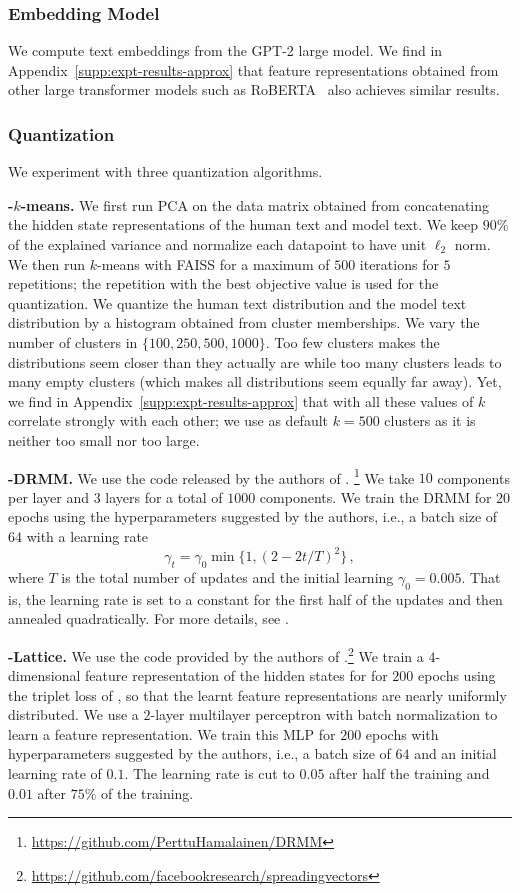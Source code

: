 \documentclass{article}
\newcommand{\myparagraph}[1]{\par\noindent\textbf{{#1}.}} %
\theoremstyle{definition}
\newcommand{\name}{{\fontfamily{bch}\selectfont{\textsc{Mauve}}}\xspace}
\begin{document}
\subsubsection{Embedding Model}
We compute text embeddings from 
the GPT-2 large model. 
We find in Appendix~\ref{supp:expt-results-approx} that feature representations obtained from other large transformer models such as RoBERTA~\cite{liu2019roberta}
also achieves similar results. 

\subsubsection{Quantization}
We experiment with three quantization algorithms. 

\myparagraph{\name-$k$-means}
We first run PCA on the 
data matrix obtained from concatenating 
the
hidden state representations
of the human text and model text. 
We keep $90\%$ of the explained variance 
and normalize each datapoint to have unit 
$\ell_2$ norm.
We then run $k$-means with FAISS
for a maximum of $500$ iterations 
for $5$ repetitions; 
the repetition with the best objective value is used for the quantization. We quantize the human text distribution and the model text distribution by a histogram obtained from cluster memberships.
We vary the number of clusters in 
$\{100, 250, 500, 1000\}$.
Too few clusters makes the distributions seem closer than they actually are while too many clusters leads to many empty clusters (which makes 
all distributions seem equally far away). 
Yet, we find in Appendix~\ref{supp:expt-results-approx} 
that \name with all these values of $k$ correlate strongly with each other; we use as default $k=500$ clusters as it is neither too small 
nor too large. 



\myparagraph{\name-DRMM}
We use the code released by the authors of \cite{hamalainen2020deep}.%
\footnote{
\url{https://github.com/PerttuHamalainen/DRMM}
}
We take $10$ components per layer 
and $3$ layers for a total of $1000$ components. 
We train the DRMM for $20$ epochs using the hyperparameters
suggested by the authors, i.e., 
a batch size of $64$
with a learning rate
\[
\gamma_t = \gamma_0 \min\{1,(2-2t/T)^2\}\,,
\]
where $T$ is the total number of updates
and the initial learning $\gamma_0 = 0.005$.
That is, the learning rate is set to a constant for the 
first half of the updates and then 
annealed quadratically.
For more details, 
see \cite[Appendix C]{hamalainen2020deep}.

\myparagraph{\name-Lattice}
We use the code provided by 
the authors of \cite{sablayrolles2018spreading}.\footnote{
\url{https://github.com/facebookresearch/spreadingvectors}}
We train a $4$-dimensional feature 
representation of the hidden states for 
for $200$ epochs using 
the triplet loss of 
\cite{sablayrolles2018spreading},
so that the learnt feature representations
are nearly uniformly distributed. 
We use a $2$-layer multilayer
perceptron with batch normalization 
to learn a feature representation.
We train this MLP for $200$ epochs with hyperparameters
suggested by the authors, i.e., 
a batch size of $64$ and an initial
learning rate of $0.1$. 
The learning rate is cut to $0.05$ 
after half the training and $0.01$ 
after $75\%$ of the training. 
\end{document}
